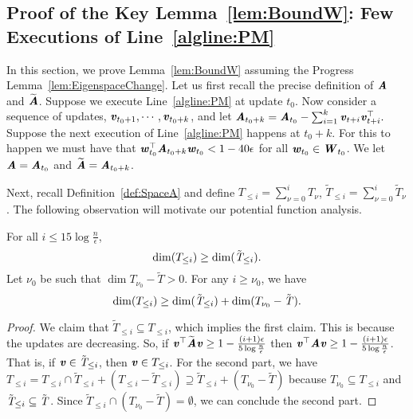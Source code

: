 

\subsection{Proof of the Key Lemma~\ref{lem:BoundW}: Few Executions of Line~\ref{algline:PM}}

\label{sec:proof key}

In this section, we prove Lemma~\ref{lem:BoundW} assuming the Progress Lemma~\ref{lem:EigenspaceChange}. 
%
Let us first recall the precise definition of $\AA$ and $\AAtil$. Suppose we execute Line~\ref{algline:PM} at update $t_{0}$. Now consider a sequence of updates, $\vv_{t_{0}+1},\cdots,\vv_{t_{0}+k}$, and let $\AA_{t_{0}+k}=\AA_{t_{0}}-\sum_{i=1}^{k}\vv_{t+i}\vv_{t+i}^{\top}.$ Suppose the next execution of Line~\ref{algline:PM} happens at $t_{0}+k$. For this to happen we must have that $\ww_{t_{0}}^{\top}\AA_{t_{0}+k}\ww_{t_{0}}<1-40\epsilon$ for all $\ww_{t_{0}}\in\WW_{t_{0}}$. We let $\AA=\AA_{t_{0}}$ and $\AAtil=\AA_{t_{0}+k}$. 

Next, recall Definition~\ref{def:SpaceA} and define $T_{\leq i}=\sum_{\nu=0}^{i}T_{\nu}$, $\tilde{T}_{\leq i}=\sum_{\nu=0}^{i}\tilde{T}_{\nu}$. The following observation will motivate our potential function analysis.
\begin{lemma}
	\label{lem:Monotone} For all $i\leq15\log\frac{n}{\epsilon}$, 
	\[
	\dim{T_{\le i}}\ge\dim{\Ttil_{\le i}}.
	\]
	Let $\nu_{0}$ be such that $\dim{T_{\nu_{0}}-\tilde{T}}>0$. For any $i\ge\nu_{0}$, we have
	\[
	\dim{T_{\le i}}\geq\dim{\Ttil_{\le i}}+\dim{T_{\nu_{0}}-\Ttil}.
	\]
	
\end{lemma}

\begin{proof}
	We claim that $\tilde{T}_{\leq i}\subseteq T_{\leq i}$, which implies the first claim. This is because the updates are decreasing. So, if $\vv^{\top}\AAtil\vv\geq1-\frac{(i+1)\epsilon}{5\log\frac{n}{\epsilon}}$ then $\vv^{\top}\AA\vv\geq1-\frac{(i+1)\epsilon}{5\log\frac{n}{\epsilon}}$. That is, if $\vv\in\Ttil_{\le i}$, then $\vv\in T_{\leq i}$. For the second part, we have $T_{\leq i}=T_{\leq i}\cap\tilde{T}_{\leq i}+(T_{\leq i}-\tilde{T}_{\leq i})\supseteq\tilde{T}_{\leq i}+(T_{\nu_{0}}-\tilde{T})$ because $T_{\nu_{0}}\subseteq T_{\le i}$ and $\Ttil_{\le i}\subseteq\Ttil$. Since $\tilde{T}_{\leq i}\cap(T_{\nu_{0}}-\tilde{T})=\emptyset$, we can conclude the second part.
\end{proof}

